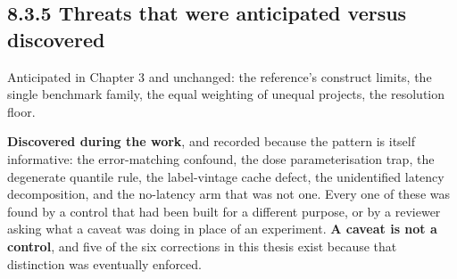 \subsection{8.3.5 Threats that were anticipated versus
discovered}\label{threats-that-were-anticipated-versus-discovered}

Anticipated in Chapter 3 and unchanged: the reference's construct
limits, the single benchmark family, the equal weighting of unequal
projects, the resolution floor.

\textbf{Discovered during the work}, and recorded because the pattern is
itself informative: the error-matching confound, the dose
parameterisation trap, the degenerate quantile rule, the label-vintage
cache defect, the unidentified latency decomposition, and the no-latency
arm that was not one. Every one of these was found by a control that had
been built for a different purpose, or by a reviewer asking what a
caveat was doing in place of an experiment. \textbf{A caveat is not a
control}, and five of the six corrections in this thesis exist because
that distinction was eventually enforced.
